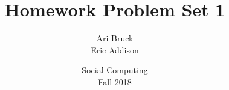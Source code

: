 \documentclass{article}
\title{Homework Problem Set 1}
\author{Ari Bruck\\Eric Addison}
\date{Social Computing\\Fall 2018}
\begin{document}
\maketitle
\pagebreak



\pagebreak

\end{document}
